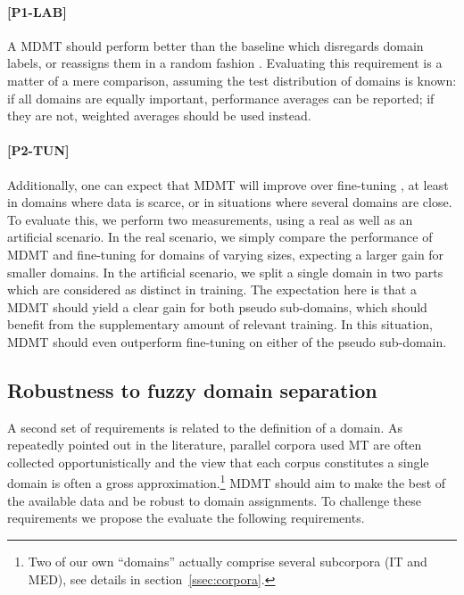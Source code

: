 \documentclass[11pt,a4paper]{article}
\newcommand{\fyTodo}[1]{\Todo[FY:]{\textcolor{orange}{#1}}}
\newcommand{\fyDone}[1]{\done[FY]\Todo[FY:]{\textcolor{orange}{#1}}}
\newcommand{\fyFuture}[1]{\done[FY]\Todo[FY:]{\textcolor{red}{#1}}}
\newcommand{\jcDone}[1]{\done[JC]\Todo[JC:]{\textcolor{blue}{#1}}}
\begin{document}
\paragraph{[P1-LAB]}\fyTodo{Decide naming scheme} A MDMT should perform better than the baseline which disregards domain labels, or reassigns them in a random fashion \cite{Joshi12multidomain}. Evaluating this requirement is a matter of a mere comparison, assuming the test distribution of domains is known: if all domains are equally important, performance averages can be reported; if they are not, weighted averages should be used instead.\fyFuture{Try random label assignments ?} %

\paragraph{[P2-TUN]} Additionally, one can expect that MDMT will improve over fine-tuning \cite{Luong15stanford,Freitag16fast}, at least in domains where data is scarce, or in situations where several domains are close. To evaluate this, we perform two measurements, using a real as well as an artificial scenario. In the real scenario, we simply compare the performance of MDMT and fine-tuning for domains of varying sizes, expecting a larger gain for smaller domains. In the artificial scenario, we split a single domain in two parts which are considered as distinct in training. The expectation here is that a MDMT should yield a clear gain for both pseudo sub-domains, which should benefit from the supplementary amount of relevant training. In this situation, MDMT should even outperform fine-tuning on either of the pseudo sub-domain.
\jcDone{I dont understand the prediction... why running MDMT on 2 artificial subdomains should show  gains over fine-tunning?}\fyDone{small loss with respect to non split ?}

\subsection{Robustness to fuzzy domain separation \label{ssec:robusness}}
A second set of requirements is related to the definition of a domain. As repeatedly pointed out in the literature, parallel corpora used MT are often collected opportunistically and the view that each corpus constitutes a single domain is often a gross approximation.\footnote{Two of our own ``domains'' actually comprise several subcorpora (IT and MED), see details in section~\ref{ssec:corpora}.} MDMT should aim to make the best of the available data and be robust to domain assignments. To challenge these requirements we propose the evaluate the following requirements.
\end{document}
